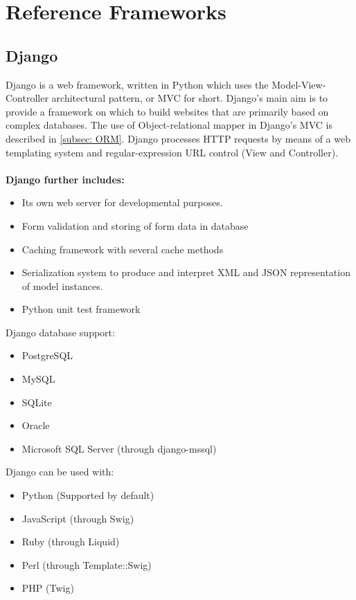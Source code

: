 \documentclass{article}
\begin{document}
\clearpage
\section{Reference Frameworks}\label{sec: RefFrameworks}


	\subsection{Django}\label{subsec: Django}
	Django is a web framework, written in Python which uses the Model-View-Controller architectural pattern, or MVC for short.
	Django's main aim is to provide a framework on which to build websites that are primarily based on complex databases.
	The use of Object-relational mapper in Django's MVC is described in \ref{subsec: ORM}. Django processes HTTP requests by means of a web templating system and regular-expression URL control (View and Controller).
	\\ \\
	\textbf{Django further includes:}
	\begin{itemize}
		\item Its own web server for developmental purposes.
		\item Form validation and storing of form data in database
		\item Caching framework with several cache methods
		\item Serialization system to produce and interpret XML and JSON representation of model instances.
		\item Python unit test framework
	\end{itemize}
	Django database support:
	\begin{itemize}
		\item PostgreSQL
		\item MySQL
		\item SQLite
		\item Oracle
		\item Microsoft SQL Server (through django-mssql)
	\end{itemize}
	Django can be used with:
	\begin{itemize}
		\item Python (Supported by default)
		\item JavaScript (through Swig)
		\item Ruby (through Liquid)
		\item Perl (through Template::Swig)
		\item PHP (Twig)
	\end{itemize}
\end{document}
